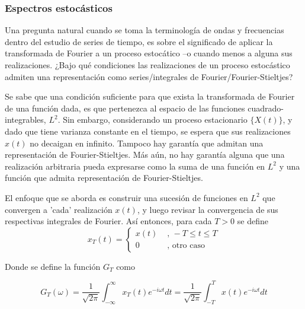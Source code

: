 \documentclass[12pt,a4paper]{mitthesis}
\newcommand{\intR}{\int_{-\infty}^{\infty}}
\begin{document}
\subsubsection{Espectros estoc\'asticos}

Una pregunta natural cuando se toma la terminolog\'ia de ondas y frecuencias dentro del estudio de 
series de tiempo, es sobre el significado de aplicar la transformada de Fourier a un proceso 
estoc\'atico --o cuando menos a alguna sus realizaciones.
¿Bajo qu\'e condiciones las realizaciones de un proceso estoc\'astico admiten una representaci\'on
como series/integrales de Fourier/Fourier-Stieltjes?

Se sabe que una condici\'on suficiente para que exista la transformada de Fourier de una funci\'on
dada, es que pertenezca al espacio de las funciones cuadrado-integrables, $L^2$.
Sin embargo, considerando un proceso estacionario $\{ X(t) \}$, y dado que tiene varianza constante 
en el tiempo, se espera que sus realizaciones $x(t)$ no decaigan en infinito. Tampoco hay 
garant\'ia que admitan una representaci\'on de Fourier-Stieltjes. M\'as a\'un, no hay garant\'ia 
alguna que una realizaci\'on arbitraria pueda expresarse como la suma de una funci\'on en $L^2$ y 
una funci\'on que admita representaci\'on de Fourier-Stieltjes.

El enfoque que se aborda es construir una sucesi\'on de funciones en $L^{2}$ que convergen a 'cada' 
realizaci\'on $x(t)$, y luego revisar la convergencia de sus respectivas integrales de Fourier. 
As\'i entonces, para cada $T>0$ se define
\begin{equation}
x_T(t) = 
\begin{cases}
x(t) & \text{ , } -T\leq t \leq T \\
0 & \text{ , otro caso}
\end{cases}
\end{equation}


Donde se define la funci\'on $G_T$ como

\begin{equation}
G_T (\omega) = \frac{1}{\sqrt{2 \pi}} \intR x_T(t) e^{-i \omega t} dt
= \frac{1}{\sqrt{2 \pi}} \int_{-T}^{T} x(t) e^{-i \omega t} dt
\end{equation}
\end{document}
